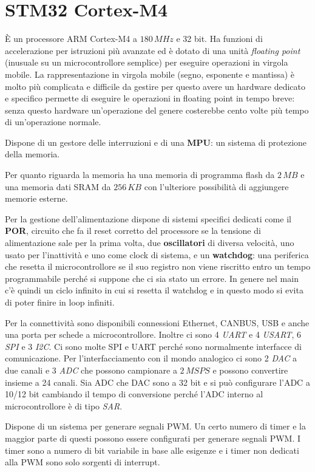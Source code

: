 \documentclass[12pt, a4paper]{report}
\begin{document}
\section{STM32 Cortex-M4}
È un processore ARM Cortex-M4 a $180\,MHz$ e 32 bit. Ha funzioni di accelerazione per istruzioni più avanzate ed è dotato di una unità \textit{floating point} (inusuale su un microcontrollore semplice) per eseguire operazioni in virgola mobile. La rappresentazione in virgola mobile (segno, esponente e mantissa) è molto più complicata e difficile da gestire per questo avere un hardware dedicato e specifico permette di eseguire le operazioni in floating point in tempo breve: senza questo hardware un'operazione del genere costerebbe cento volte più tempo di un'operazione normale.

Dispone di un gestore delle interruzioni e di una \textbf{MPU}: un sistema di protezione della memoria.

Per quanto riguarda la memoria ha una memoria di programma flash da $2\,MB$ e una memoria dati SRAM da $256\,KB$ con l'ulteriore possibilità di aggiungere memorie esterne.

Per la gestione dell'alimentazione dispone di sistemi specifici dedicati come il \textbf{POR}, circuito che fa il reset corretto del processore se la tensione di alimentazione sale per la prima volta, due \textbf{oscillatori} di diversa velocità, uno usato per l'inattività e uno come clock di sistema, e un \textbf{watchdog}: una periferica che resetta il microcontrollore se il suo registro non viene riscritto entro un tempo programmabile perché si suppone che ci sia stato un errore. In genere nel main c'è quindi un ciclo infinito in cui si resetta il watchdog e in questo modo si evita di poter finire in loop infiniti.

Per la connettività sono disponibili connessioni Ethernet, CANBUS, USB e anche una porta per schede a microcontrollore. Inoltre ci sono 4 \textit{UART} e 4 \textit{USART}, 6 \textit{SPI} e 3 \textit{I2C}. Ci sono molte SPI e UART perché sono normalmente interfacce di comunicazione. Per l'interfacciamento con il mondo analogico ci sono 2 \textit{DAC} a due canali e 3 \textit{ADC} che possono campionare a $2\,MSPS$ e possono convertire insieme a 24 canali. Sia ADC che DAC sono a 32 bit e si può configurare l'ADC a 10/12 bit cambiando il tempo di conversione perché l'ADC interno al microcontrollore è di tipo \textit{SAR}.

Dispone di un sistema per generare segnali PWM. Un certo numero di timer e la maggior parte di questi possono essere configurati per generare segnali PWM. I timer sono a numero di bit variabile in base alle esigenze e i timer non dedicati alla PWM sono solo sorgenti di interrupt.
\end{document}
